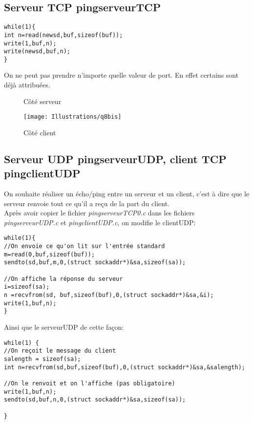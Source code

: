 \documentclass[paper=a4, fontsize=12pt]{article}
\numberwithin{equation}{section}		%
\numberwithin{figure}{section}			%
\numberwithin{table}{section}				%
\begin{document}
\subsection{Serveur TCP pingserveurTCP}
\begin{verbatim}
while(1){
int n=read(newsd,buf,sizeof(buf));
write(1,buf,n);
write(newsd,buf,n);
}
\end{verbatim}
On ne peut pas prendre n'importe quelle valeur de port. En effet certains sont déjà attribuées.

\begin{figure}[h!]
\caption{\label{Illustrations/q8}Côté serveur}
\end{figure}
\newpage%
\begin{figure}[h!]
\centerline{\texttt{[image: Illustrations/q8bis]}}
\caption{\label{Illustrations/q8bis} Côté client}
\end{figure}
\subsection{Serveur UDP pingserveurUDP, client TCP pingclientUDP}
On souhaite réaliser un écho/ping entre un serveur et un client, c'est à dire que le serveur renvoie tout ce qu'il a reçu de la part du client. 
\\Après avoir copier le fichier \textit{pingserveurTCP0.c} dans les fichiers  \textit{pingserveurUDP.c} et  \textit{pingclientUDP.c}, on modifie le clientUDP:
\begin{verbatim}
while(1){
//On envoie ce qu'on lit sur l'entrée standard
m=read(0,buf,sizeof(buf));
sendto(sd,buf,m,0,(struct sockaddr*)&sa,sizeof(sa));

//On affiche la réponse du serveur
i=sizeof(sa);
n =recvfrom(sd, buf,sizeof(buf),0,(struct sockaddr*)&sa,&i);
write(1,buf,n);
}
\end{verbatim}
Ainsi que le serveurUDP de cette façon:
\begin{verbatim}
while(1) {
//On reçoit le message du client
salength = sizeof(sa);
int n=recvfrom(sd,buf,sizeof(buf),0,(struct sockaddr*)&sa,&salength);

//On le renvoit et on l'affiche (pas obligatoire)
write(1,buf,n);
sendto(sd,buf,n,0,(struct sockaddr*)&sa,sizeof(sa));

}	
\end{verbatim}
\newpage%
\end{document}
